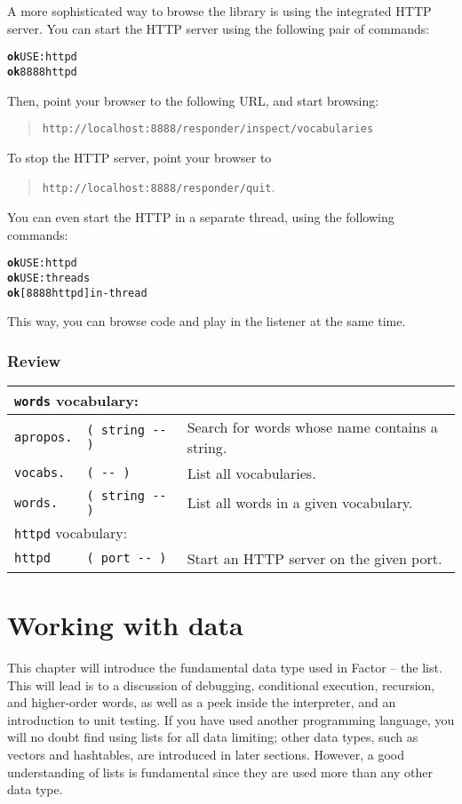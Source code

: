 \documentclass[english]{book}
\newcommand{\wordtable}[1]{{
\begin{tabularx}{12cm}{|l l X|}
#1
\hline
\end{tabularx}}}
\newcommand{\tabvocab}[1]{
\hline
\multicolumn{3}{|l|}{
\rule[-2mm]{0mm}{6mm}
\texttt{#1} vocabulary:}
\\
\hline
}
\begin{document}
A more sophisticated way to browse the library is using the integrated HTTP server. You can start the HTTP server using the following pair of commands:

\begin{alltt}
\textbf{ok} USE: httpd
\textbf{ok} 8888 httpd
\end{alltt}

Then, point your browser to the following URL, and start browsing:

\begin{quote}
\texttt{http://localhost:8888/responder/inspect/vocabularies}
\end{quote}

To stop the HTTP server, point your browser to

\begin{quote}
\texttt{http://localhost:8888/responder/quit}.
\end{quote}

You can even start the HTTP in a separate thread, using the following commands:

\begin{alltt}
\textbf{ok} USE: httpd
\textbf{ok} USE: threads
\textbf{ok} [ 8888 httpd ] in-thread
\end{alltt}

This way, you can browse code and play in the listener at the same time.

\subsection*{Review}

\wordtable{
\tabvocab{words}
\texttt{apropos.}&
\texttt{( string -{}- )}&
Search for words whose name contains a string.\\
\texttt{vocabs.}&
\texttt{( -{}- )}&
List all vocabularies.\\
\texttt{words.}&
\texttt{( string -{}- )}&
List all words in a given vocabulary.\\
\tabvocab{httpd}
\texttt{httpd}&
\texttt{( port -{}- )}&
Start an HTTP server on the given port.\\
}

\chapter{Working with data}

This chapter will introduce the fundamental data type used in Factor -- the list.
This will lead is to a discussion of debugging, conditional execution, recursion, and higher-order words, as well as a peek inside the interpreter, and an introduction to unit testing. If you have used another programming language, you will no doubt find using lists for all data limiting; other data types, such as vectors and hashtables, are introduced in later sections. However, a good understanding of lists is fundamental since they are used more than any other data type. 
\end{document}
